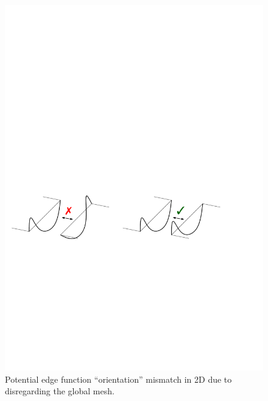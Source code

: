 \begin{figure}[!ht]
\begin{center}
\includegraphics[scale=0.7]{./figures/OrientationsEdgeMismatch.pdf}
\caption{Potential edge function ``orientation'' mismatch in 2D due to disregarding the global mesh.}
\label{fig:edgemismatchintro}
\end{center}
\end{figure}

